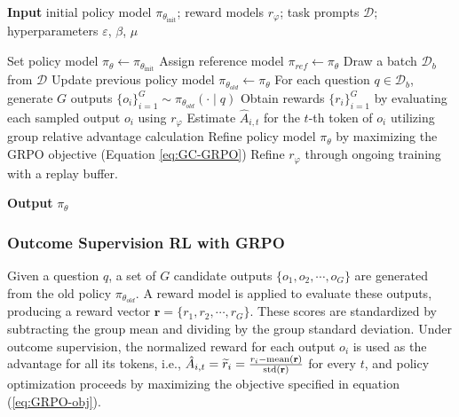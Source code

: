 \begin{algorithm}[t]
  \small
  \caption{Iterative Group Relative Policy Optimization}
  \textbf{Input} initial policy model $\pi_{\theta_{\text{init}}}$; reward models $r_\varphi$; task prompts $\mathcal{D}$; 
  hyperparameters $\varepsilon$, $\beta$, $\mu$
  \begin{algorithmic}[1]
    \State Set policy model $\pi_\theta \leftarrow \pi_{\theta_{\text{init}}}$
       \State Assign reference model $\pi_{ref} \leftarrow \pi_{\theta}$
      \State Draw a batch $\mathcal{D}_b$ from $\mathcal{D}$
      \State Update previous policy model $\pi_{\theta_{old}} \leftarrow \pi_{\theta}$
      \State For each question $q \in \mathcal{D}_b$, generate $G$ outputs $\{o_i\}_{i=1}^G \sim \pi_{\theta_{old}} (\cdot \mid q) $
      \State Obtain rewards $\{r_i\}_{i=1}^{G}$ by evaluating each sampled output $o_i$ using $r_{\varphi}$
      \State Estimate $\hat{A}_{i,t}$ for the $t$-th token of $o_i$ utilizing group relative advantage calculation
        \State Refine policy model $\pi_{\theta}$ by maximizing the GRPO objective (Equation \ref{eq:GC-GRPO})
      \EndFor
    \EndFor \State Refine $r_\varphi$ through ongoing training with a replay buffer. 
    \EndFor 
  \end{algorithmic}
  \textbf{Output} $\pi_\theta$
  \label{alg:iter-grpo}
\end{algorithm}

\subsubsection{Outcome Supervision RL with GRPO} Given a question $q$, a set of $G$ candidate outputs $\{o_1, o_2, \cdots, o_G\}$ are generated from the old policy $\pi_{\theta_{old}}$. A reward model is applied to evaluate these outputs, producing a reward vector $\mathbf{r} = \{r_1, r_2, \cdots, r_G\}$. These scores are standardized by subtracting the group mean and dividing by the group standard deviation. Under outcome supervision, the normalized reward for each output $o_i$ is used as the advantage for all its tokens, i.e., $\hat{A}_{i, t} = \widetilde{r}_i = \frac{r_i- {\rm mean}(\mathbf{r})}{{\rm std}(\mathbf{r})}$ for every $t$, and policy optimization proceeds by maximizing the objective specified in equation (\ref{eq:GRPO-obj}).

